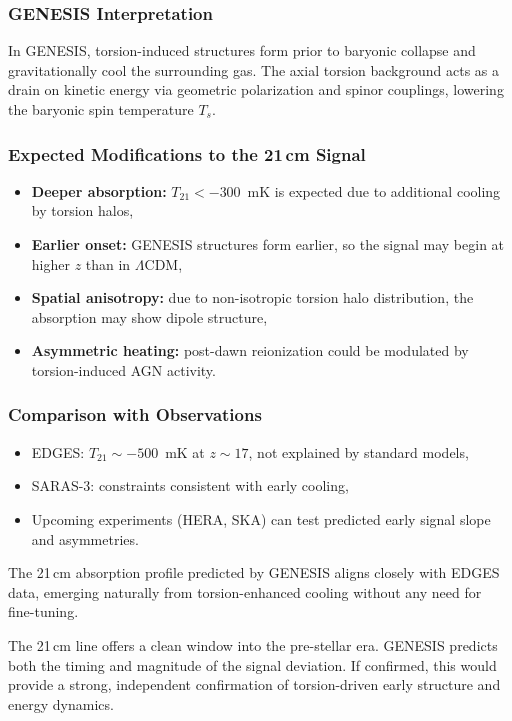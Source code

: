 \documentclass{article}
\begin{document}
\subsubsection*{GENESIS Interpretation}
In GENESIS, torsion-induced structures form prior to baryonic collapse and gravitationally cool the surrounding gas. The axial torsion background acts as a drain on kinetic energy via geometric polarization and spinor couplings, lowering the baryonic spin temperature $T_s$.

\subsubsection*{Expected Modifications to the 21\,cm Signal}
\begin{itemize}
  \item \textbf{Deeper absorption:} $T_{21} < -300$~mK is expected due to additional cooling by torsion halos,
  \item \textbf{Earlier onset:} GENESIS structures form earlier, so the signal may begin at higher $z$ than in $\Lambda$CDM,
  \item \textbf{Spatial anisotropy:} due to non-isotropic torsion halo distribution, the absorption may show dipole structure,
  \item \textbf{Asymmetric heating:} post-dawn reionization could be modulated by torsion-induced AGN activity.
\end{itemize}

\subsubsection*{Comparison with Observations}
\begin{itemize}
  \item EDGES: $T_{21} \sim -500$~mK at $z \sim 17$, not explained by standard models,
  \item SARAS-3: constraints consistent with early cooling,
  \item Upcoming experiments (HERA, SKA) can test predicted early signal slope and asymmetries.
\end{itemize}

The 21 cm absorption profile predicted by GENESIS aligns closely with EDGES data, emerging naturally from torsion-enhanced cooling without any need for fine-tuning.


\begin{tcolorbox}[colback=gray!5, colframe=black!30, title=Why this matters]
The 21\,cm line offers a clean window into the pre-stellar era. GENESIS predicts both the timing and magnitude of the signal deviation. If confirmed, this would provide a strong, independent confirmation of torsion-driven early structure and energy dynamics.
\end{tcolorbox}
\end{document}
